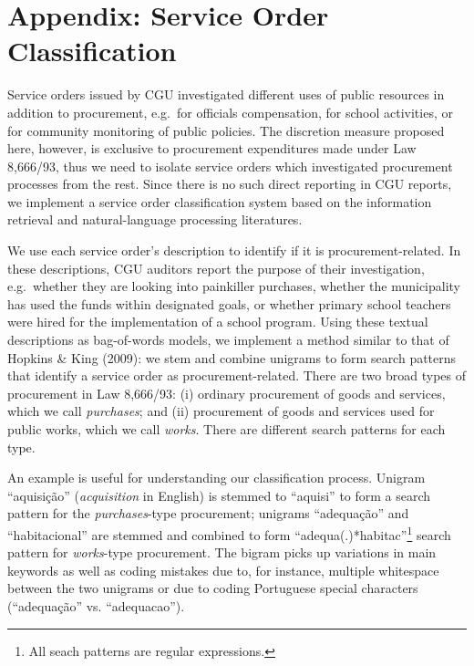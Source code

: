 \documentclass[]{article}
\title{}
\author{}
\date{}
\let\rmarkdownfootnote\footnote%
\def\footnote{\protect\rmarkdownfootnote}
\theoremstyle{definition}
\theoremstyle{definition}
\theoremstyle{definition}
\theoremstyle{remark}
\begin{document}
\hypertarget{appendix-appendix}{%
\appendix}


\hypertarget{appendixA}{%
\section{Appendix: Service Order Classification}\label{appendixA}}

Service orders issued by CGU investigated different uses of public
resources in addition to procurement, e.g.~for officials compensation,
for school activities, or for community monitoring of public policies.
The discretion measure proposed here, however, is exclusive to
procurement expenditures made under Law 8,666/93, thus we need to
isolate service orders which investigated procurement processes from the
rest. Since there is no such direct reporting in CGU reports, we
implement a service order classification system based on the information
retrieval and natural-language processing literatures.

We use each service order's description to identify if it is
procurement-related. In these descriptions, CGU auditors report the
purpose of their investigation, e.g.~whether they are looking into
painkiller purchases, whether the municipality has used the funds within
designated goals, or whether primary school teachers were hired for the
implementation of a school program. Using these textual descriptions as
bag-of-words models, we implement a method similar to that of Hopkins \&
King (2009): we stem and combine unigrams to form search patterns that
identify a service order as procurement-related. There are two broad
types of procurement in Law 8,666/93: (i) ordinary procurement of goods
and services, which we call \emph{purchases}; and (ii) procurement of
goods and services used for public works, which we call \emph{works}.
There are different search patterns for each type.

An example is useful for understanding our classification process.
Unigram ``aquisição'' (\emph{acquisition} in English) is stemmed to
``aquisi'' to form a search pattern for the \emph{purchases}-type
procurement; unigrams ``adequação'' and ``habitacional'' are stemmed and
combined to form ``adequa(.)*habitac''\footnote{All seach patterns are
  regular expressions.} search pattern for \emph{works}-type
procurement. The bigram picks up variations in main keywords as well as
coding mistakes due to, for instance, multiple whitespace between the
two unigrams or due to coding Portuguese special characters
(``adequação'' vs. ``adequacao'').
\end{document}
